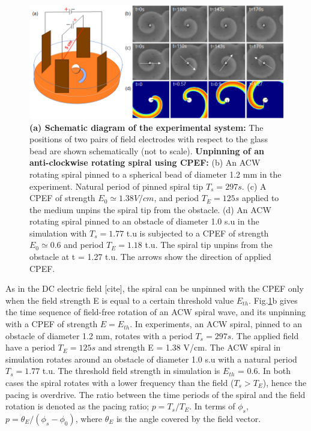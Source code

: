 \documentclass[%
 preprint,
 amsmath,amssymb,
 aps,
]{revtex4-2}
\begin{document}

\begin{figure}[H]
    \centering
    \includegraphics[scale=0.7]{new_fig.png}
    \caption{\textbf{(a) Schematic diagram of the experimental system:} The positions of two pairs of field electrodes with respect to the glass bead are shown schematically (not to scale).
    \textbf{Unpinning of an anti-clockwise rotating spiral using CPEF:}  (b) An ACW rotating spiral pinned to a spherical bead of diameter 1.2 mm in the experiment. Natural period of pinned spiral tip $T_{s} = 297 s$. (c) A CPEF of strength $E_0 \simeq 1.38 V/cm$, and period $T_{E} = 125 s$ applied to the medium unpins the spiral tip from the obstacle. 
    (d) An ACW rotating spiral pinned to an obstacle of diameter 1.0 s.u in the simulation with $T_{s} = 1.77$ t.u is subjected to a CPEF of strength $E_0 \simeq 0.6 $ and period $T_{E} =1.18$ t.u. The spiral tip unpins from the obstacle at t = 1.27 t.u.
    The arrows show the direction of applied CPEF.}
    \label{fig:unpinning_images}
\end{figure}
 
As in the DC electric field [cite], the spiral can be unpinned with the CPEF only when the field strength E is equal to a certain threshold value $E_{th}$.
Fig.\ref{fig:unpinning_images}b gives the time sequence of field-free rotation of an ACW spiral wave, and its unpinning with a CPEF of strength $E = E_{th}$.
In experiments, an ACW spiral, pinned to an obstacle of diameter 1.2 mm, rotates with a period $T_{s} = 297 s$. The applied field have a period $T_{E} = 125 s$ and strength E = 1.38 V/cm. The ACW spiral in simulation rotates around an obstacle of diameter 1.0 s.u with a natural period $T_{s} = 1.77$ t.u. The threshold field strength in simulation is $E_{th}$ = 0.6. In both cases the spiral rotates with a lower frequency than the field ($T_{s} > T_{E}$), hence the pacing is overdrive. The ratio between the time periods of the spiral and the field rotation is denoted as the pacing ratio; $p = T_{s}/T_{E}$. In terms of $\phi_s$, $p = \theta_{E}/(\phi_{s} - \phi_{0})$, where $\theta_{E}$ is the angle covered by the field vector.
\end{document}
